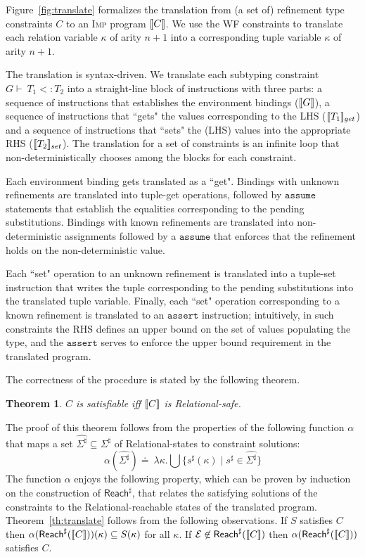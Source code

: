 \documentclass[nocopyrightspace]{sigplanconf}
\makeatletter
\newtheorem{@protheo}{Theorem}
\newenvironment{theorem}[1]{\begin{@protheo}{\rm \bf #1}\it}{\end{@protheo}}
\newcommand{\defeq}{\doteq\ }
\def\set#1{{\{ #1\}}}
\newcommand{\Convert}{\alpha}
\newcommand{\Soln}{S}
\def\subt{<:}
\newcommand{\ASSERT}[2]{\{{#1}\}\ {#2}}
\newcommand{\ERROR}{\mathit{Error}}
\newcommand{\kvar}{\kappa}
\newcommand{\renv}{G}
\newcommand{\tliqs}{T}
\newcommand{\deriv}{\vdash\ }
\newcommand{\ilang}{\textsc{Imp}\xspace}
\newcommand{\istate}{s}
\newcommand{\istates}{\Sigma}
\newcommand{\rstate}{\istate^{\sharp}}
\newcommand{\rstates}{\istates^{\sharp}}
\def\ASSUME{{{\mathtt{assume}}}}
\def\ASSERT{{{\mathtt{assert}}}}
\def\rkvar{{\kvar}}
\def\RELSEM{{Relational}\xspace}
\def\REFREL{relation\xspace}
\def\ERROR{{\mathcal{E}}}
\def\rreach{\mathsf{Reach}^{\sharp}}
\makeatother
\begin{document}
Figure~\ref{fig:translate} formalizes the translation 
from (a set of) refinement type constraints $C$ to an \ilang program $[\![C]\!]$.
We use the WF constraints to translate each \REFREL 
variable $\kvar$ of arity $n+1$ into a corresponding 
tuple variable $\rkvar$ of arity $n+1$.

The translation is syntax-driven.
We translate each subtyping constraint
$\renv \deriv \tliqs_1 \subt \tliqs_2$ 
into a straight-line block of instructions with three parts: 
a sequence of instructions that establishes 
the environment bindings
($\translate{\renv}$),
a sequence of instructions that ``gets" the 
values corresponding to the LHS 
($\translate{\tliqs_1}_{get}$)
and a sequence of instructions that ``sets" the (LHS) values
into the appropriate RHS
($\translate{\tliqs_2}_{set}$).
The translation for a set of constraints is an infinite loop
that non-deterministically chooses among the blocks for each constraint.

Each environment binding gets translated as a ``get". 
Bindings with unknown refinements are translated into tuple-get operations,
followed by $\ASSUME$ statements that establish the equalities
corresponding to the pending substitutions.
Bindings with known refinements are translated into non-deterministic assignments
followed by a $\ASSUME$ that enforces that the refinement holds on the
non-deterministic value.

Each ``set" operation to an unknown refinement is translated into a
tuple-set instruction that writes the tuple corresponding to the pending
substitutions into the translated tuple variable.
Finally, each ``set" operation corresponding to a known refinement is
translated to an $\ASSERT$ instruction; intuitively, in such constraints 
the RHS defines an upper bound on the set of values populating the type, 
and the $\ASSERT$ serves to enforce the upper bound requirement in the
translated program.



The correctness of the procedure is stated by the following theorem.

\begin{theorem}{}\label{th:translate}
$C$ is satisfiable iff $[\![C]\!]$ is \emph{\RELSEM-safe}.
\end{theorem}

The proof of this theorem follows from the properties of the 
following function $\Convert$ that maps a set $\hat{\rstates}\subseteq\rstates$
of \RELSEM-states to constraint solutions:
$$\Convert(\hat{\rstates}) \defeq 
\lambda \kvar. \bigcup \set{\rstate(\rkvar) \mid \rstate \in \hat{\rstates}}$$
The function $\Convert$ enjoys the following property, which can be
proven by induction on the construction of $\rreach$, that relates the
satisfying solutions of the constraints to the \RELSEM-reachable states 
of the translated program. 
Theorem~\ref{th:translate} follows from the following observations.
If $\Soln$ satisfies $C$ then 
      $\Convert(\rreach(\translate{C}))(\kvar) \subseteq \Soln(\kvar)$
for all $\kvar$.
If $\ERROR \not \in \rreach(\translate{C})$ then
      $\Convert(\rreach(\translate{C}))$ satisfies $C$.
\end{document}
